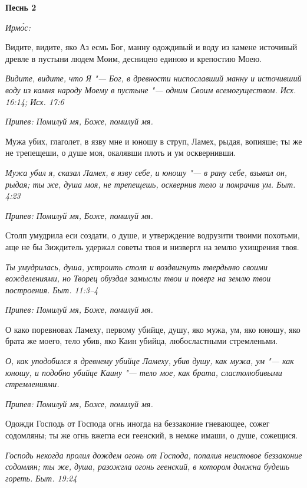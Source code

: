 \bfseries Песнь 2\normalfont{}


\itshape Ирмо́с:\normalfont{}


Видите, видите, яко Аз есмь Бог, манну одождивый и воду из камене источивый древле в пустыни людем Моим, десницею единою и крепостию Моею.


\itshape Видите, видите, что Я "--- Бог, в древности ниспославший манну и источивший воду из камня народу Моему в пустыне "--- одним Своим всемогуществом. Исх. 16:14; Исх. 17:6\normalfont{}


\itshape Припев:\normalfont{} Помилуй мя, Боже, помилуй мя.


Мужа убих, глаголет, в язву мне и юношу в струп, Ламех, рыдая, вопияше; ты же не трепещеши, о душе моя, окалявши плоть и ум осквернивши.


\itshape Мужа убил я, сказал Ламех, в язву себе, и юношу "--- в рану себе, взывал он, рыдая; ты же, душа моя, не трепещешь, осквернив тело и помрачив ум. Быт. 4:23\normalfont{}


\itshape Припев:\normalfont{} Помилуй мя, Боже, помилуй мя.


Столп умудрила еси создати, о душе, и утверждение водрузити твоими похотьми, аще не бы Зиждитель удержал советы твоя и низвергл на землю ухищрения твоя.


\itshape Ты умудрилась, душа, устроить столп и воздвигнуть твердыню своими вожделениями, но Творец обуздал замыслы твои и поверг на землю твои построения. Быт. 11:3–4\normalfont{}


\itshape Припев:\normalfont{} Помилуй мя, Боже, помилуй мя.


О како поревновах Ламеху, первому убийце, душу, яко мужа, ум, яко юношу, яко брата же моего, тело убив, яко Каин убийца, любосластными стремленьми.


\itshape О, как уподобился я древнему убийце Ламеху, убив душу, как мужа, ум "--- как юношу, и подобно убийце Каину "--- тело мое, как брата, сластолюбивыми стремлениями.\normalfont{}


\itshape Припев:\normalfont{} Помилуй мя, Боже, помилуй мя.


Одожди Господь от Господа огнь иногда на беззаконие гневающее, сожег содомляны; ты же огнь вжегла еси геенский, в немже имаши, о душе, сожещися.


\itshape Господь некогда пролил дождем огонь от Господа, попалив неистовое беззаконие содомлян; ты же, душа, разожгла огонь геенский, в котором должна будешь гореть. Быт. 19:24\normalfont{}


